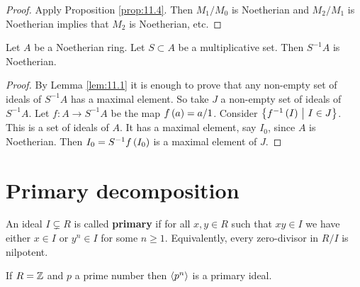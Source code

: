 \begin{proof}
Apply Proposition \ref{prop:11.4}. Then $ M_1 / M_0 $ is Noetherian and $ M_2 / M_1 $ is Noetherian implies that $ M_2 $ is Noetherian, etc.
\end{proof}

\begin{lemma}
Let $ A $ be a Noetherian ring. Let $ S \subset A $ be a multiplicative set. Then $ S^{-1}A $ is Noetherian.
\end{lemma}

\begin{proof}
By Lemma \ref{lem:11.1} it is enough to prove that any non-empty set of ideals of $ S^{-1}A $ has a maximal element. So take $ J $ a non-empty set of ideals of $ S^{-1}A $. Let $ f : A \to S^{-1}A $ be the map $ f\br{a} = a / 1 $. Consider $ \cbr{f^{-1}\br{I} \st I \in J} $. This is a set of ideals of $ A $. It has a maximal element, say $ I_0 $, since $ A $ is Noetherian. Then $ I_0 = S^{-1}f\br{I_0} $ is a maximal element of $ J $.
\end{proof}

\pagebreak

\section{Primary decomposition}

\begin{definition}
An ideal $ I \subsetneq R $ is called \textbf{primary} if for all $ x, y \in R $ such that $ xy \in I $ we have either $ x \in I $ or $ y^n \in I $ for some $ n \ge 1 $. Equivalently, every zero-divisor in $ R / I $ is nilpotent.
\end{definition}

\begin{example*}
If $ R = \mathbb{Z} $ and $ p $ a prime number then $ \left\langle p^n \right\rangle $ is a primary ideal.
\end{example*}

